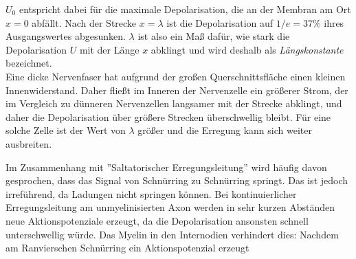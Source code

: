 $U_0$ entspricht dabei für die maximale Depolarisation, die an der Membran am Ort $x=0$ abfällt. Nach der Strecke $x=\lambda$ ist die Depolarisation auf $1/e = 37\%$ ihres Ausgangswertes abgesunken. $\lambda$ ist also ein Maß dafür, wie stark die Depolarisation $U$ mit der Länge $x$ abklingt und wird deshalb als \textit{Längskonstante} bezeichnet.\\

\noindent
Eine dicke Nervenfaser hat aufgrund der großen Querschnittsfläche einen kleinen Innenwiderstand. Daher fließt im Inneren der Nervenzelle ein größerer Strom, der im Vergleich zu dünneren Nervenzellen langsamer mit der Strecke abklingt, und daher die Depolarisation über größere Strecken überschwellig bleibt. Für eine solche Zelle ist der Wert von $\lambda$ größer und die Erregung kann sich weiter ausbreiten.

\noindent
Im Zusammenhang mit ''Saltatorischer Erregungsleitung'' wird häufig davon gesprochen, dass das Signal von Schnürring zu Schnürring springt. Das ist jedoch irreführend, da Ladungen nicht springen können. Bei kontinuierlicher Erregungsleitung am unmyelinisierten Axon werden in sehr kurzen Abständen neue Aktionspotenziale erzeugt, da die Depolarisation ansonsten schnell unterschwellig würde. Das Myelin in den Internodien verhindert dies: Nachdem am Ranvierschen Schnürring ein Aktionspotenzial erzeugt

